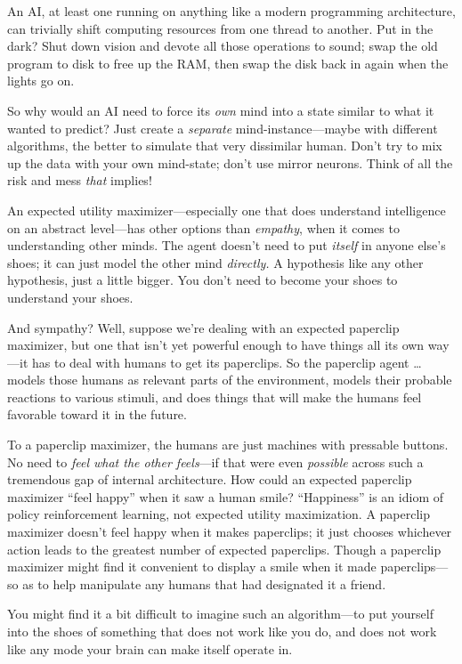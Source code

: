 {
 An AI, at least one running on anything like a modern programming
architecture, can trivially shift computing resources from one thread
to another. Put in the dark? Shut down vision and devote all those
operations to sound; swap the old program to disk to free up the RAM,
then swap the disk back in again when the lights go on.}

{
 So why would an AI need to force its \textit{own} mind into a
state similar to what it wanted to predict? Just create a
\textit{separate} mind-instance---maybe with different algorithms, the
better to simulate that very dissimilar human. Don't
try to mix up the data with your own mind-state; don't
use mirror neurons. Think of all the risk and mess \textit{that}
implies!}

{
 An expected utility maximizer---especially one that does
understand intelligence on an abstract level---has other options than
\textit{empathy}, when it comes to understanding other minds. The agent
doesn't need to put \textit{itself} in anyone
else's shoes; it can just model the other mind
\textit{directly.} A hypothesis like any other hypothesis, just a
little bigger. You don't need to become your shoes to
understand your shoes.}

{
 And sympathy? Well, suppose we're dealing with an
expected paperclip maximizer, but one that isn't yet
powerful enough to have things all its own way---it has to deal with
humans to get its paperclips. So the paperclip agent \ldots models those
humans as relevant parts of the environment, models their probable
reactions to various stimuli, and does things that will make the humans
feel favorable toward it in the future.}

{
 To a paperclip maximizer, the humans are just machines with
pressable buttons. No need to \textit{feel what the other feels}{}---if
that were even \textit{possible} across such a tremendous gap of
internal architecture. How could an expected paperclip maximizer
``feel happy'' when it saw a human
smile? ``Happiness'' is an idiom of
policy reinforcement learning, not expected utility maximization. A
paperclip maximizer doesn't feel happy when it makes
paperclips; it just chooses whichever action leads to the greatest
number of expected paperclips. Though a paperclip maximizer might find
it convenient to display a smile when it made paperclips---so as to
help manipulate any humans that had designated it a friend.}

{
 You might find it a bit difficult to imagine such an
algorithm---to put yourself into the shoes of something that does not
work like you do, and does not work like any mode your brain can make
itself operate in.}

